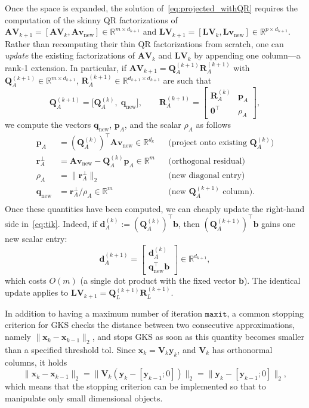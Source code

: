 \documentclass[%
  a4paper,
  onecolumn,
  colorlinks,
]{preprint}
\theoremstyle{plain}
\theoremstyle{definition}
\newcommand{\R}{\ensuremath{\mathbb{R}}}
\newcommand{\bA}{\ensuremath{\boldsymbol{A}}}
\newcommand{\bL}{\ensuremath{\boldsymbol{L}}}
\newcommand{\bQ}{\ensuremath{\boldsymbol{Q}}}
\newcommand{\bR}{\ensuremath{\boldsymbol{R}}}
\newcommand{\bV}{\ensuremath{\boldsymbol{V}}}
\newcommand{\bb}{\mathbf{b}}
\newcommand{\br}{\mathbf{r}}
\newcommand{\by}{\mathbf{y}}
\newcommand{\bx}{\mathbf{x}}
\newcommand{\bq}{\mathbf{q}}
\newcommand{\bd}{\mathbf{d}}
\newcommand{\bp}{\mathbf{p}}
\newcommand{\bv}{\mathbf{v}}
\newcommand{\vnew}{\bv_{\mathrm{new}}}
\begin{document}
Once the space is expanded, the solution of~\eqref{eq:projected_withQR} requires the computation of the skinny QR factorizations of 
$\bA\bV_{k+1}=[\bA\bV_{k},\bA\vnew] \in \R^{m \times d_{k+1}}$ and
$\bL\bV_{k+1}=[\bL\bV_{k},\bL\vnew] \in \R^{p \times d_{k+1}}$.
Rather than recomputing their thin QR factorizations from scratch, one can
\emph{update} the existing factorizations of $\bA\bV_{k}$ and $\bL\bV_{k}$ by appending one column---a rank-1
extension.
In particular, if $\bA\bV_{k+1} = \bQ_A^{(k+1)}\bR_A^{(k+1)}$ with $\bQ_A^{(k+1)}\in\R^{m\times d_{k+1}}$,
$\bR_A^{(k+1)}\in\R^{d_{k+1}\times d_{k+1}}$ are such that 
\begin{equation}\label{eq:updqr}
  \bQ_A^{(k+1)} = \bigl[\bQ_A^{(k)},\;\bq_\mathrm{new}\bigr],
  \qquad
  \bR_A^{(k+1)} = \begin{bmatrix}\bR_A^{(k)} & \bp_A \\ \mathbf{0}^\top & \rho_A\end{bmatrix}
,
\end{equation}
we compute the vectors $\bq_\mathrm{new}$, $\bp_A$, and the scalar $\rho_A$ as follows
\begin{align*}
  \bp_A &= (\bQ_A^{(k)})^\top \bA\vnew \in \R^{d_k}
  &&\text{(project onto existing } \bQ_A^{(k)}\text{)}
 \\
  \br^\perp_A &= \bA\vnew - \bQ_A^{(k)}\bp_A \in \R^m
  &&\text{(orthogonal residual)}
 \\
  \rho_A &= \|\br^\perp_A\|_2
  &&\text{(new diagonal entry)}\\
  \bq_\mathrm{new} &= \br^\perp_A / \rho_A \in \R^m
  &&\text{(new } \bQ_A^{(k+1)}\text{ column).}\\
\end{align*}
Once these quantities have been computed, we can cheaply update the right-hand side in~\eqref{eq:tik}. Indeed, if 
$\bd_A^{(k)}:=(\bQ_A^{(k)})^\top \bb$, then $(\bQ_A^{(k+1)})^\top\bb$ gains one new scalar entry:
\begin{equation}\label{eq:dA_update}
  \bd_A^{(k+1)} = \begin{bmatrix}\bd_A^{(k)} \\ \bq_\mathrm{new}^\top\bb\end{bmatrix}
  \in\R^{d_{k+1}},
\end{equation}
which costs $O(m)$ (a single dot product with the fixed vector $\bb$).
The identical update applies to $\bL\bV_{k+1} = \bQ_L^{(k+1)}\bR_L^{(k+1)}$.


In addition to having a maximum number of iteration $\mathtt{maxit}$, a common stopping criterion for GKS checks the distance between two consecutive approximations, namely $\|\bx_k-\bx_{k-1}\|_2$, and stops GKS as soon as this quantity becomes smaller than a specified threshold {\ttfamily tol}. Since $\bx_k=\bV_k\by_k$, and $\bV_k$ has orthonormal columns, it holds
\begin{equation}\label{eq:stoppingcriterion_cheap}
\|\bx_k-\bx_{k-1}\|_2=\|\bV_k(\by_k-[\by_{k-1};0])\|_2=\|\by_k-[\by_{k-1};0]\|_2,    
\end{equation}
which means that the stopping criterion can be implemented so that to manipulate only small dimensional objects.
\end{document}
